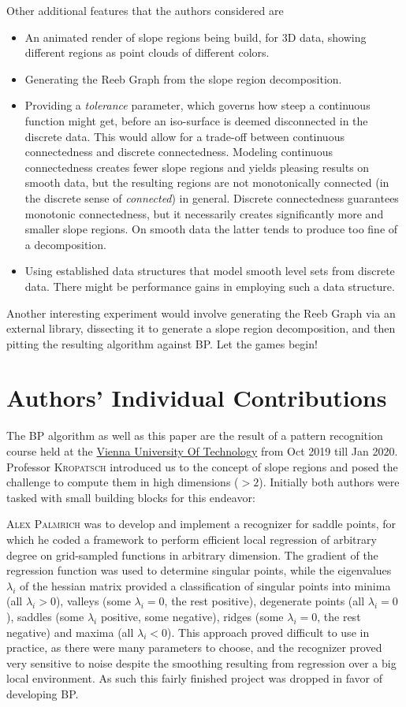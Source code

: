 \documentclass[a4paper,12pt,notitlepage,fullpage]{paper}
\theoremstyle{plain}
\theoremstyle{definition}
\begin{document}
Other additional features that the authors considered are
\begin{itemize}
\item An animated render of slope regions being build, for 3D data, showing different regions as point clouds of different colors.
\item Generating the Reeb Graph from the slope region decomposition.
\item Providing a \emph{tolerance} parameter, which governs how steep a continuous function might get, before an iso-surface is deemed disconnected in the discrete data.
This would allow for a trade-off between continuous connectedness and discrete connectedness.
Modeling continuous connectedness creates fewer slope regions and yields pleasing results on smooth data, but the resulting regions are not monotonically connected (in the discrete sense of \emph{connected}) in general.
Discrete connectedness guarantees monotonic connectedness, but it necessarily creates significantly more and smaller slope regions.
On smooth data the latter tends to produce too fine of a decomposition.
\item Using established data structures that model smooth level sets from discrete data. There might be performance gains in employing such a data structure.
\end{itemize}

Another interesting experiment would involve generating the Reeb Graph via an external library, dissecting it to generate a slope region decomposition, and then pitting the resulting algorithm against BP. Let the games begin!

\section{Authors' Individual Contributions}
The BP algorithm as well as this paper are the result of a pattern recognition course held at the \href{https://www.tuwien.at/en/}{Vienna University Of Technology} from Oct 2019 till Jan 2020. Professor \textsc{Kropatsch} introduced us to the concept of slope regions and posed the challenge to compute them in high dimensions ($>2$). Initially both authors were tasked with small building blocks for this endeavor:

\textsc{Alex Palmrich} was to develop and implement a recognizer for saddle points, for which he coded a framework to perform efficient local regression of arbitrary degree on grid-sampled functions in arbitrary dimension. The gradient of the regression function was used to determine singular points, while the eigenvalues $\lambda_i$ of the hessian matrix provided a classification of singular points into minima (all $\lambda_i>0$), valleys (some $\lambda_i=0$, the rest positive), degenerate points (all $\lambda_i=0$), saddles (some $\lambda_i$ positive, some negative), ridges (some $\lambda_i=0$, the rest negative) and maxima (all $\lambda_i<0$). This approach proved difficult to use in practice, as there were many parameters to choose, and the recognizer proved very sensitive to noise despite the smoothing resulting from regression over a big local environment. As such this fairly finished project was dropped in favor of developing BP.
\end{document}
